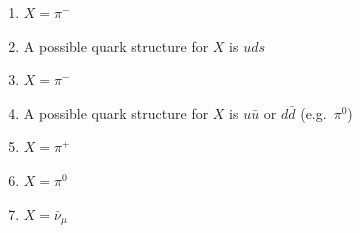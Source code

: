 \documentclass[12pt]{article}
\begin{document}
\begin{enumerate}
    \item $X = \pi^{-}$
    \item A possible quark structure for $X$ is $uds$
    \item $X = \pi^{-}$
    \item A possible quark structure for $X$ is $u\bar{u}$ or $d\bar{d}$ (e.g.\ $\pi^{0}$)
    \item $X = \pi^{+}$
    \item $X = \pi^{0}$
    \item $X = \bar{\nu}_\mu$
\end{enumerate}
\end{document}
